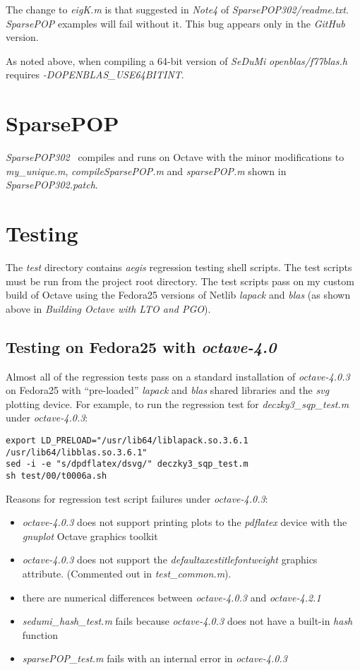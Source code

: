 \documentclass[a4paper,twoside,10pt,english]{report}
\begin{document}
The change to \emph{eigK.m} is that suggested in \emph{Note4} of 
\emph{SparsePOP302/readme.txt}. \emph{SparsePOP} examples will fail without it.
This bug appears only in the \emph{GitHub} version.

As noted above, when compiling a 64-bit version of \emph{SeDuMi}
\emph{openblas/f77blas.h} requires \emph{-DOPENBLAS\_USE64BITINT}. 

\section*{SparsePOP}
\emph{SparsePOP302}~\cite{SparsePOP} compiles and runs on Octave with the
minor modifications to \emph{my\_unique.m}, \emph{compileSparsePOP.m} and
\emph{sparsePOP.m} shown in \emph{SparsePOP302.patch}.

\section*{Testing}
The \emph{test} directory contains \emph{aegis} regression testing shell
scripts. The test scripts must be run from the project root directory. The
test scripts pass on my custom build of Octave using the Fedora25 versions of
Netlib \emph{lapack} and \emph{blas} (as shown above in \emph{Building Octave
with LTO and PGO}).
\subsection*{Testing on Fedora25 with \emph{octave-4.0}}
Almost all of the regression tests pass on a standard installation of
\emph{octave-4.0.3} on Fedora25 with ``pre-loaded'' \emph{lapack} and
\emph{blas} shared libraries and the \emph{svg} plotting device. For example,
to run the regression test for \emph{deczky3\_sqp\_test.m} under
\emph{octave-4.0.3}:
\begin{small}
\begin{verbatim}
export LD_PRELOAD="/usr/lib64/liblapack.so.3.6.1 /usr/lib64/libblas.so.3.6.1"
sed -i -e "s/dpdflatex/dsvg/" deczky3_sqp_test.m
sh test/00/t0006a.sh
\end{verbatim}
\end{small}
Reasons for regression test script failures under \emph{octave-4.0.3}:
\begin{itemize}
\item \emph{octave-4.0.3} does not support printing plots to the
  \emph{pdflatex} device with the \emph{gnuplot} Octave graphics toolkit
\item \emph{octave-4.0.3} does not support the
  \emph{defaultaxestitlefontweight} graphics attribute. (Commented out in
  \emph{test\_common.m}).
\item there are numerical differences between \emph{octave-4.0.3} and
  \emph{octave-4.2.1} 
\item \emph{sedumi\_hash\_test.m} fails because \emph{octave-4.0.3} does not
  have a built-in \emph{hash} function
\item \emph{sparsePOP\_test.m} fails with an internal error in
  \emph{octave-4.0.3} 
\end{itemize}
\end{document}
